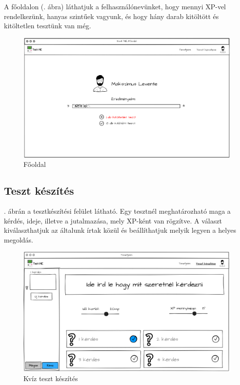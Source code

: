 
A főoldalon (. ábra) láthatjuk a felhasználónevünket, hogy mennyi XP-vel rendelkezünk, hanyas szintűek vagyunk, és hogy hány darab kitöltött és kitöltetlen tesztünk van még.

\begin{figure}[h!]
    \centering
    \includegraphics[width=\linewidth]{images/main_login_wireframe.png}
    \caption{Főoldal}
    \label{fig:main_page}
\end{figure}

\subsection{Teszt készítés}

. ábrán a tesztkészítési felület látható. Egy tesztnél meghatározható maga a kérdés, ideje, illetve a jutalmazása, mely XP-ként van rögzítve. A választ kiválaszthatjuk az általunk írtak közül és beállíthatjuk melyik legyen a helyes megoldás.

\begin{figure}[h!]
    \centering
    \includegraphics[width=\linewidth]{images/make_test_wireframe.png}
    \caption{Kvíz teszt készítés}
    \label{fig:new_quiz_question}
\end{figure}

